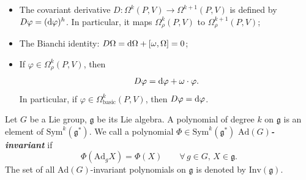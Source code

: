 \begin{itemize}[leftmargin=*]
\begin{align*}
        \pi^*\phi\; \reflectbox{$\longmapsto$}& \;\phi.
    \end{align*}
    \item The covariant derivative $D:\Omega^k(P,V)\to\Omega^{k+1}(P,V)$ 
    is defined by $D\varphi = ({\rm d}\varphi)^h$. In particular, 
    it maps $\Omega^k_{\rho}(P,V)$ to $\Omega^{k+1}_{\rho}(P,V)$; 
    \item The Bianchi identity: $D\Omega = {\rm d}\Omega + [\omega,\Omega] = 0$; 
    \item If $\varphi\in\Omega^k_{\rho}(P,V)$, then
    \begin{equation*}
        D\varphi = {\rm d}\varphi + \omega\cdot\varphi.
    \end{equation*}
    In particular, if $\varphi\in\Omega^k_{\text{basic}}(P,V)$, then $D\varphi = {\rm d}\varphi$.
\end{itemize}
\begin{definition}
    Let $G$ be a Lie group, $\mathfrak{g}$ be its Lie algebra. 
    A polynomial of degree $k$ on $\mathfrak{g}$ is an element of $\mathrm{Sym}^k(\mathfrak{g}^*)$. 
    We call a polynomial $\Phi\in\mathrm{Sym}^k(\mathfrak{g}^*)$ \emph{\textbf{$\mathrm{Ad}(G)$-invariant}} if 
    \begin{equation*}
        \Phi(\mathrm{Ad}_g X) = \Phi(X)\qquad\forall\,g\in G,\,X\in\mathfrak{g}.
    \end{equation*}
    The set of all $\mathrm{Ad}(G)$-invariant polynomials on $\mathfrak{g}$ is denoted by $\mathrm{Inv}(\mathfrak{g})$.
\end{definition}
